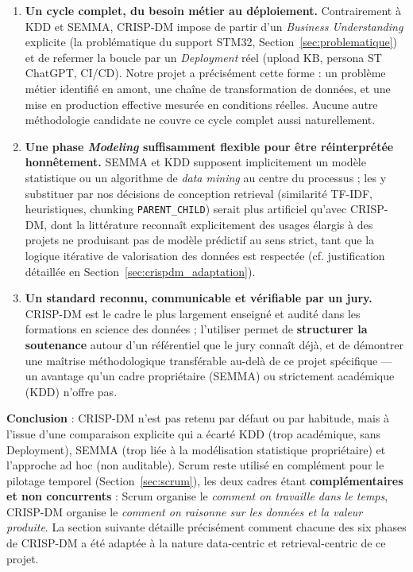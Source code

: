 \documentclass[12pt,a4paper]{report}
\begin{document}
\begin{enumerate}
  \item \textbf{Un cycle complet, du besoin métier au déploiement.} Contrairement à KDD et SEMMA, CRISP-DM impose de partir d'un \textit{Business Understanding} explicite (la problématique du support STM32, Section~\ref{sec:problematique}) et de refermer la boucle par un \textit{Deployment} réel (upload KB, persona ST ChatGPT, CI/CD). Notre projet a précisément cette forme : un problème métier identifié en amont, une chaîne de transformation de données, et une mise en production effective mesurée en conditions réelles. Aucune autre méthodologie candidate ne couvre ce cycle complet aussi naturellement.

  \item \textbf{Une phase \textit{Modeling} suffisamment flexible pour être réinterprétée honnêtement.} SEMMA et KDD supposent implicitement un modèle statistique ou un algorithme de \textit{data mining} au centre du processus ; les y substituer par nos décisions de conception retrieval (similarité TF-IDF, heuristiques, chunking \texttt{PARENT\_CHILD}) serait plus artificiel qu'avec CRISP-DM, dont la littérature reconnaît explicitement des usages élargis à des projets ne produisant pas de modèle prédictif au sens strict, tant que la logique itérative de valorisation des données est respectée (cf. justification détaillée en Section~\ref{sec:crispdm_adaptation}).

  \item \textbf{Un standard reconnu, communicable et vérifiable par un jury.} CRISP-DM est le cadre le plus largement enseigné et audité dans les formations en science des données ; l'utiliser permet de \textbf{structurer la soutenance} autour d'un référentiel que le jury connaît déjà, et de démontrer une maîtrise méthodologique transférable au-delà de ce projet spécifique --- un avantage qu'un cadre propriétaire (SEMMA) ou strictement académique (KDD) n'offre pas.
\end{enumerate}

\textbf{Conclusion} : CRISP-DM n'est pas retenu par défaut ou par habitude, mais à l'issue d'une comparaison explicite qui a écarté KDD (trop académique, sans Deployment), SEMMA (trop liée à la modélisation statistique propriétaire) et l'approche ad hoc (non auditable). Scrum reste utilisé en complément pour le pilotage temporel (Section~\ref{sec:scrum}), les deux cadres étant \textbf{complémentaires et non concurrents} : Scrum organise le \textit{comment on travaille dans le temps}, CRISP-DM organise le \textit{comment on raisonne sur les données et la valeur produite}. La section suivante détaille précisément comment chacune des six phases de CRISP-DM a été adaptée à la nature data-centric et retrieval-centric de ce projet.
\end{document}
